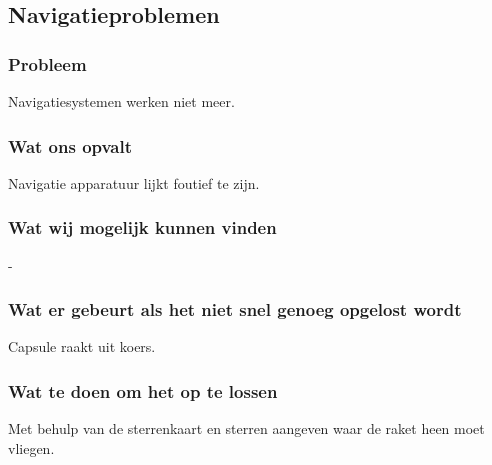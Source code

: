 \subsection{Navigatieproblemen}

\subsubsection{Probleem}
Navigatiesystemen werken niet meer.

\subsubsection{Wat ons opvalt}
Navigatie apparatuur lijkt foutief te zijn.

\subsubsection{Wat wij mogelijk kunnen vinden}
-

\subsubsection{Wat er gebeurt als het niet snel genoeg opgelost wordt}
Capsule raakt uit koers.

\subsubsection{Wat te doen om het op te lossen}
Met behulp van de sterrenkaart en sterren aangeven waar de raket heen moet vliegen.